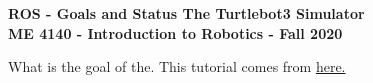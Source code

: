 \documentclass[12pt]{article}
\begin{document}
\thispagestyle{plain}

\begin{center}
   {\bf \Large ROS - Goals and Status The Turtlebot3 Simulator}\vspace{2mm} \\
   {\bf \large ME 4140 - Introduction to Robotics - Fall 2020} \\
\end{center}



What is the goal of the.  This tutorial comes from \href{http://emanual.robotis.com/docs/en/platform/turtlebot3/simulation/#simulation} {here.}  \\

\end{document}
